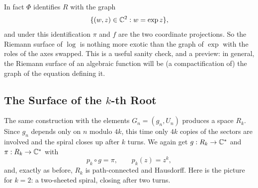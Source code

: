 \documentclass[a4paper]{scrartcl}
\newcommand{\Cs}{\C^*}
\begin{document}
\begin{remark}
	In fact $\Phi$ identifies $R$ with the graph
	$$
	\{(w, z) \in \mathbb{C}^2 : w = \exp z\},
	$$
	and under this identification $\pi$ and $f$ are the two coordinate projections. So the
	Riemann surface of $\log$ is nothing more exotic than the graph of $\exp$ with the
	roles of the axes swapped. This is a useful sanity check, and a preview: in general,
	the Riemann surface of an algebraic function will be (a compactification of) the graph
	of the equation defining it.
\end{remark}

\subsection{The Surface of the $k$-th Root}

The same construction with the elements $G_n = (g_n, U_n)$ produces a space $R_k$. Since
$g_n$ depends only on $n$ modulo $4k$, this time only $4k$ copies of the sectors are
involved and the spiral closes up after $k$ turns. We again get $g : R_k \to \Cs$ and
$\pi : R_k \to \Cs$ with
$$
p_k \circ g = \pi, \qquad p_k(z) = z^k,
$$
and, exactly as before, $R_k$ is path-connected and Hausdorff. Here is the picture for
$k = 2$: a two-sheeted spiral, closing after two turns.

\begin{center}
\end{center}
\end{document}
